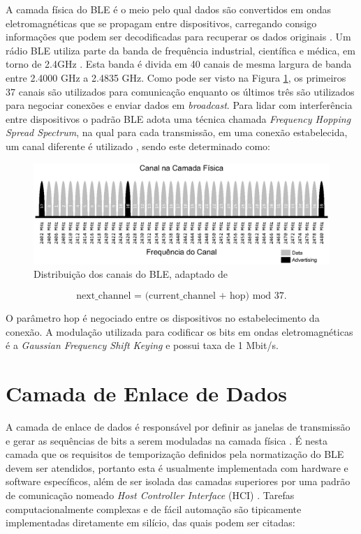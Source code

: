 \documentclass[a5paper]{ufsc-thesis}  %
\begin{document}
A camada física do BLE é o meio pelo qual dados são convertidos em ondas eletromagnéticas que se propagam entre dispositivos, carregando consigo informações que podem ser decodificadas para recuperar os dados originais \cite{Tanenbaum_Wetherall_2014}. 
Um rádio BLE utiliza parte da banda de frequência industrial, científica e médica, em torno de 2.4GHz \cite{Townsend_2014}. Esta banda é divida em 40 canais de mesma largura de banda entre 2.4000 GHz a 2.4835 GHz. Como pode ser visto na Figura \ref{fig:ble_channels}, os primeiros 37 canais são utilizados para comunicação enquanto os últimos três são utilizados para negociar conexões e enviar dados em \textit{broadcast}.
Para lidar com interferência entre dispositivos o padrão BLE adota uma técnica chamada \textit{Frequency Hopping Spread Spectrum}, na qual para cada transmissão, em uma conexão estabelecida, um canal diferente é utilizado \cite{Tanenbaum_Wetherall_2014}, sendo este determinado como:

\begin{figure}
    \centering
    \includegraphics[width=1\linewidth]{imagens/ble_channels.eps}
    \caption{Distribuição dos canais do BLE, adaptado de \cite{Townsend_2014}}
    \label{fig:ble_channels}
\end{figure}

\begin{equation}
    \text{next\_channel = (current\_channel + hop) mod 37}.
\end{equation}

O parâmetro hop é negociado entre os dispositivos no estabelecimento da conexão. A modulação utilizada para codificar os bits em ondas eletromagnéticas é a \textit{Gaussian Frequency Shift Keying} e possui taxa de 1 Mbit/s.

\section{Camada de Enlace de Dados}
A camada de enlace de dados é responsável por definir as janelas de transmissão e gerar as sequências de bits a serem moduladas na camada física \cite{Tanenbaum_Wetherall_2014}. É nesta camada que os requisitos de temporização definidos pela normatização do BLE devem ser atendidos, portanto esta é usualmente implementada com hardware e software específicos, além de ser isolada das camadas superiores por uma padrão de comunicação nomeado \textit{Host Controller Interface} (HCI) \cite{Townsend_2014}. 
Tarefas computacionalmente complexas e de fácil automação são tipicamente implementadas diretamente em silício, das quais podem ser citadas:
\end{document}
